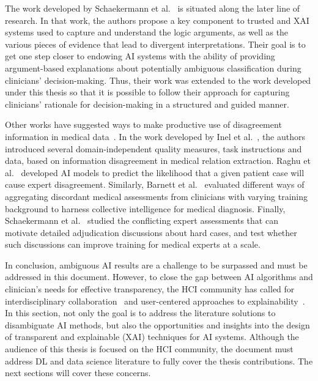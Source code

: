 The work developed by Schaekermann et al.~\cite{10.1145/3308560.3317085} is situated along the later line of research.
In that work, the authors propose a key component to trusted and \ac{XAI} systems used to capture and understand the logic arguments, as well as the various pieces of evidence that lead to divergent interpretations.
Their goal is to get one step closer to endowing \ac{AI} systems with the ability of providing argument-based explanations about potentially ambiguous classification during clinicians' decision-making.
Thus, their work was extended to the work developed under this thesis so that it is possible to follow their approach for capturing clinicians' rationale for decision-making in a structured and guided manner.

Other works have suggested ways to make productive use of disagreement information in medical data~\cite{10.1001/jamanetworkopen.2019.0096, 10.1007/978-3-319-11915-1_31, pmlr-v97-raghu19a, 10.1145/3313831.3376506}.
In the work developed by Inel et al.~\cite{10.1007/978-3-319-11915-1_31}, the authors introduced several domain-independent quality measures, task instructions and data, based on information disagreement in medical relation extraction.
Raghu et al.~\cite{pmlr-v97-raghu19a} developed \ac{AI} models to predict the likelihood that a given patient case will cause expert disagreement.
Similarly, Barnett et al.~\cite{10.1001/jamanetworkopen.2019.0096} evaluated different ways of aggregating discordant medical assessments from clinicians with varying training background to harness collective intelligence for medical diagnosis.
Finally, Schaekermann et al.~\cite{10.1145/3313831.3376506, SchaekermannMike2020} studied the conflicting expert assessments that can motivate detailed adjudication discussions about hard cases, and test whether such discussions can improve training for medical experts at a scale.

In conclusion, ambiguous \ac{AI} results are a challenge to be surpassed and must be addressed in this document.
However, to close the gap between \ac{AI} algorithms and clinician's needs for effective transparency, the \ac{HCI} community has called for interdisciplinary collaboration~\cite{10.1145/3173574.3174156, Tschandl2020} and user-centered approaches to explainability~\cite{10.1145/3290605.3300831, 10.1145/3313831.3376590}.
In this section, not only the goal is to address the literature solutions to disambiguate \ac{AI} methods, but also the opportunities and insights into the design of transparent and explainable (\ac{XAI}) techniques for \ac{AI} systems.
Although the audience of this thesis is focused on the \ac{HCI} community, the document must address \ac{DL} and data science literature to fully cover the thesis contributions.
The next sections will cover these concerns.

